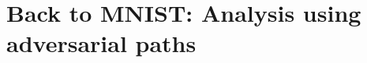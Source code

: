 \documentclass[12pt, oneside]{book}
\begin{document}

\section{Back to MNIST: Analysis using adversarial paths}
\end{document}
